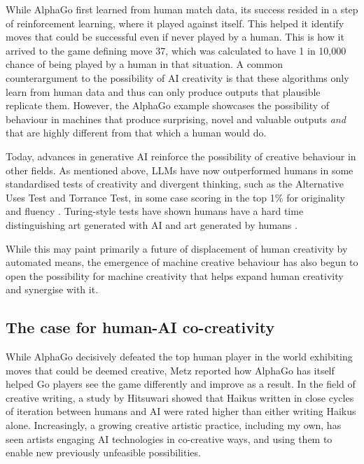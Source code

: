 While AlphaGo first learned from human match data, its success resided in a step of reinforcement learning, where it played against itself. This helped it identify moves that could be successful even if never played by a human. This is how it arrived to the game defining move 37, which was calculated to have 1 in 10,000 chance of being played by a human in that situation. A common counterargument to the possibility of AI creativity is that these algorithms only learn from human data and thus can only produce outputs that plausible replicate them. However, the AlphaGo example showcases the possibility of behaviour in machines that produce surprising, novel and valuable outputs \textit{and} that are highly different from that which a human would do.

Today, advances in generative AI reinforce the possibility of creative behaviour in other fields. As mentioned above, LLMs have now outperformed humans in some standardised tests of creativity and divergent thinking, such as the Alternative Uses Test and Torrance Test, in some case scoring in the top 1\% for originality and fluency \cite{Hubert2024-kv, Guzik2023-cl, Koivisto2023-lw}. Turing-style tests have shown humans have a hard time distinguishing art generated with AI and art generated by humans \cite{Alexander2024-pz}. 

While this may paint primarily a future of displacement of human creativity by automated means, the emergence of machine creative behaviour has also begun to open the possibility for machine creativity that helps expand human creativity and synergise with it. 

\subsection{The case for human-AI co-creativity}

While AlphaGo decisively defeated the top human player in the world exhibiting moves that could be deemed creative, Metz \cite{Metz2016-dm} reported how AlphaGo has itself helped Go players see the game differently and improve as a result. In the field of creative writing, a study by Hitsuwari \cite{Hitsuwari2023-tw} showed that Haikus written in close cycles of iteration between humans and AI were rated higher than either writing Haikus alone. Increasingly, a growing creative artistic practice, including my own, has seen artists engaging AI technologies in co-creative ways, and using them to enable new previously unfeasible possibilities. 

